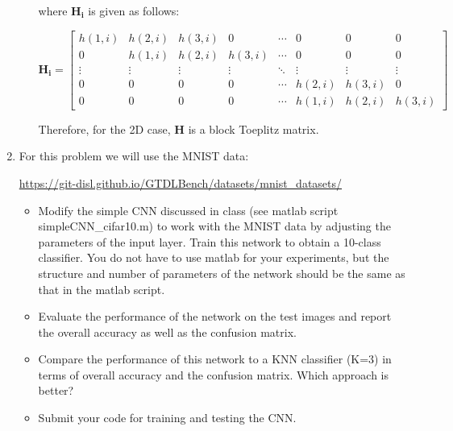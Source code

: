 \documentclass[fleqn]{article}
\begin{document}
\begin{enumerate}
\begin{enumerate}
			where $\mathbf{H_i}$ is given as follows:
			
			\begin{equation*}
				\mathbf{H_i} = \begin{bmatrix}
					h(1,i) & h(2,i) & h(3,i) & 0      & \cdots & 0      & 0      & 0 \\
					0      & h(1,i) & h(2,i) & h(3,i) & \cdots & 0      & 0      & 0 \\
					\vdots & \vdots & \vdots & \vdots & \ddots & \vdots & \vdots & \vdots \\
					0      & 0      & 0      & 0      & \cdots & h(2,i) & h(3,i) & 0 \\
					0      & 0      & 0      & 0      & \cdots & h(1,i) & h(2,i) & h(3,i)
				\end{bmatrix}
			\end{equation*}
			
			Therefore, for the 2D case, $\mathbf{H}$ is a block Toeplitz matrix.
		\end{enumerate}
		
		\item For this problem we will use the MNIST data:
		
		\href{https://git-disl.github.io/GTDLBench/datasets/mnist\_datasets/}{https://git-disl.github.io/GTDLBench/datasets/mnist\_datasets/}
		
		\begin{itemize}
			\item Modify the simple CNN discussed in class (see matlab script \newline simpleCNN\_cifar10.m) to work with the MNIST data by adjusting the parameters of the input layer. Train this network to obtain a 10-class classifier. You do not have to use matlab for your experiments, but the structure and number of parameters of the network should be the same as that in the matlab script.
			
			\item Evaluate the performance of the network on the test images and report the overall accuracy as well as the confusion matrix.
			
			\item Compare the performance of this network to a KNN classifier (K=3) in terms of overall accuracy and the confusion matrix. Which approach is better?
			
			\item Submit your code for training and testing the CNN.
			
		\end{itemize}
		

\end{enumerate}
\end{document}
